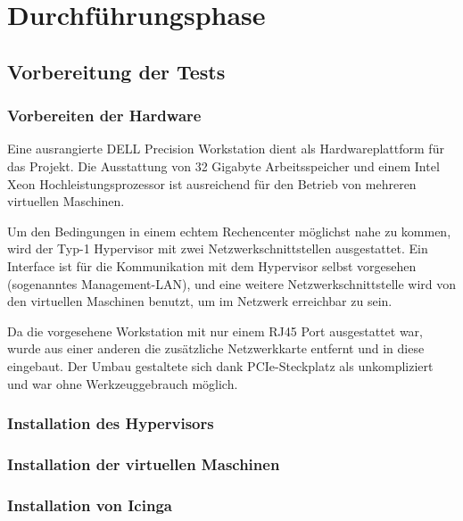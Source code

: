 \section{Durchführungsphase}
\label{sec:Durchführungsphase}

\subsection{Vorbereitung der Tests}
\label{sec:VorbereitungTests}

\subsubsection{Vorbereiten der Hardware}
\label{sec:VorbereitungHardware}
Eine ausrangierte DELL Precision Workstation dient als Hardwareplattform für das Projekt. Die Ausstattung von 32 Gigabyte Arbeitsspeicher und einem Intel Xeon Hochleistungsprozessor ist ausreichend für den Betrieb von mehreren virtuellen Maschinen.

Um den Bedingungen in einem \glqq{}echtem\grqq{} Rechencenter möglichst nahe zu kommen, wird der Typ-1 Hypervisor mit zwei Netzwerkschnittstellen ausgestattet. Ein Interface ist für die Kommunikation mit dem Hypervisor selbst vorgesehen (sogenanntes Management-LAN), und eine weitere Netzwerkschnittstelle wird von den virtuellen Maschinen benutzt, um im Netzwerk erreichbar zu sein.

Da die vorgesehene Workstation mit nur einem RJ45 Port ausgestattet war, wurde aus einer anderen die zusätzliche Netzwerkkarte entfernt und in diese eingebaut. Der Umbau gestaltete sich dank PCIe-Steckplatz als unkompliziert und war ohne Werkzeuggebrauch möglich.

\subsubsection{Installation des Hypervisors}
\label{sec:InstallationHypervisor}

\subsubsection{Installation der virtuellen Maschinen}
\label{sec:InstallationVMs}

\subsubsection{Installation von \glqq{}Icinga\grqq{}}
\label{sec:InstallationIcinga}

